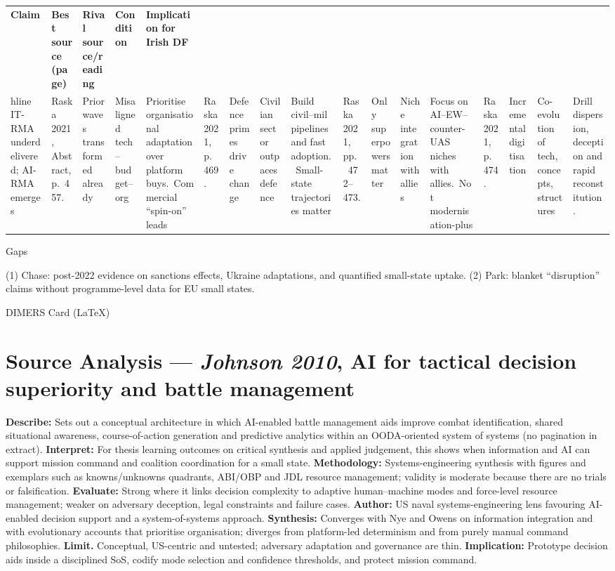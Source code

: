 \usepackage{array}
\begin{tabular}{p{3.2cm}p{4.2cm}p{3.6cm}p{3.2cm}p{4.2cm}}
	\textbf{Claim} & \textbf{Best source (page)} & \textbf{Rival source/reading} & \textbf{Condition} & \textbf{Implication for Irish DF}\\hline
	IT-RMA underdelivered; AI-RMA emerges & Raska 2021, Abstract, p.~457. & Prior waves transformed already & Misaligned tech–budget–org & Prioritise organisational adaptation over platform buys.\
	Commercial “spin-on” leads & Raska 2021, p.~469. & Defence primes drive change & Civilian sector outpaces defence & Build civil–mil pipelines and fast adoption.\
	Small-state trajectories matter & Raska 2021, pp.~472–473. & Only superpowers matter & Niche integration with allies & Focus on AI–EW–counter-UAS niches with allies.\
	Not modernisation-plus & Raska 2021, p.~474. & Incremental digitisation & Co-evolution of tech, concepts, structures & Drill dispersion, deception and rapid reconstitution.\
\end{tabular}

Gaps

(1) Chase: post-2022 evidence on sanctions effects, Ukraine adaptations, and quantified small-state uptake.
(2) Park: blanket “disruption” claims without programme-level data for EU small states.

\parencite{JOHNSON_2010}

DIMERS Card (LaTeX)

\section*{Source Analysis — \textit{Johnson 2010}, AI for tactical decision superiority and battle management}
\textbf{Describe:} Sets out a conceptual architecture in which AI-enabled battle management aids improve combat identification, shared situational awareness, course-of-action generation and predictive analytics within an OODA-oriented system of systems (no pagination in extract).
\textbf{Interpret:} For thesis learning outcomes on critical synthesis and applied judgement, this shows when information and AI can support mission command and coalition coordination for a small state.
\textbf{Methodology:} Systems-engineering synthesis with figures and exemplars such as knowns/unknowns quadrants, ABI/OBP and JDL resource management; validity is moderate because there are no trials or falsification.
\textbf{Evaluate:} Strong where it links decision complexity to adaptive human–machine modes and force-level resource management; weaker on adversary deception, legal constraints and failure cases.
\textbf{Author:} US naval systems-engineering lens favouring AI-enabled decision support and a system-of-systems approach.
\textbf{Synthesis:} Converges with Nye and Owens on information integration and with evolutionary accounts that prioritise organisation; diverges from platform-led determinism and from purely manual command philosophies.
\textbf{Limit.} Conceptual, US-centric and untested; adversary adaptation and governance are thin.
\textbf{Implication:} Prototype decision aids inside a disciplined SoS, codify mode selection and confidence thresholds, and protect mission command.

